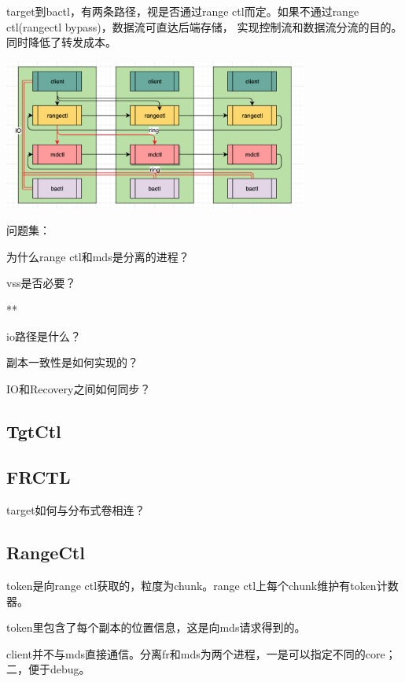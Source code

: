 target到bactl，有两条路径，视是否通过range ctl而定。如果不通过range ctl(rangectl bypass)，数据流可直达后端存储，
实现控制流和数据流分流的目的。同时降低了转发成本。

\begin{center}
\includegraphics[width=10cm]{../imgs/message-flow.png}
\end{center}

问题集：
\begin{enumbox}
\item 为什么range ctl和mds是分离的进程？
\item vss是否必要？
\item ***
\item io路径是什么？
\item 副本一致性是如何实现的？
\item IO和Recovery之间如何同步？
\end{enumbox}

\subsection{TgtCtl}

\subsection{FRCTL}

target如何与分布式卷相连？

\subsection{RangeCtl}

token是向range ctl获取的，粒度为chunk。range ctl上每个chunk维护有token计数器。

token里包含了每个副本的位置信息，这是向mds请求得到的。

client并不与mds直接通信。分离fr和mds为两个进程，一是可以指定不同的core；二，便于debug。

